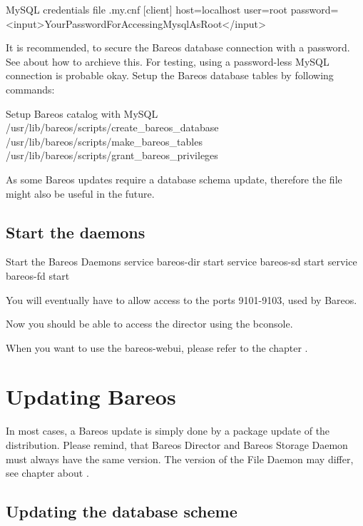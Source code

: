 \begin{config}{MySQL credentials file .my.cnf}
[client]
host=localhost
user=root
password=<input>YourPasswordForAccessingMysqlAsRoot</input>
\end{config}

It is recommended, to secure the Bareos database connection with a password.
See  about how to archieve this.
For testing, using a password-less MySQL connection is probable okay.
Setup the Bareos database tables by following commands:
\begin{commands}{Setup Bareos catalog with MySQL}
/usr/lib/bareos/scripts/create_bareos_database
/usr/lib/bareos/scripts/make_bareos_tables
/usr/lib/bareos/scripts/grant_bareos_privileges
\end{commands}

As some Bareos updates require a database schema update,
therefore the file  might also be useful in the future.


\section{Start the daemons}
    \label{sec:StartDaemons}

\begin{commands}{Start the Bareos Daemons}
service bareos-dir start
service bareos-sd start
service bareos-fd start
\end{commands}

You will eventually have to allow access to the ports 9101-9103, used by Bareos.

Now you should be able to access the director using the bconsole.

When you want to use the bareos-webui, please refer to the chapter .



\chapter{Updating Bareos}
\label{bareos-update}

In most cases, a Bareos update is simply done by a package update of the distribution.
Please remind, that Bareos Director and Bareos Storage Daemon must always have the same version.
The version of the File Daemon may differ, see chapter about .

\section{Updating the database scheme}

